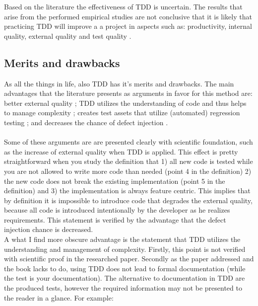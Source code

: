 Based on the literature the effectiveness of TDD is uncertain. The results that arise from the performed empirical
studies are not conclusive that it is likely that practicing TDD will improve a a project in aspects such as:
productivity, internal quality, external quality and test quality \autocite{SAC-J-2003-GeorgeW04} \autocite{MAKING_SOFTWARE}.

\subsection*{Merits and drawbacks}

As all the things in life, also TDD has it's merits and drawbacks. The main advantages that the literature presents
as arguments in favor for this method are:
better external quality \autocite[340]{SAC-J-2003-GeorgeW04} \autocite[212]{MAKING_SOFTWARE};
TDD utilizes the understanding of code and thus helps to manage complexity \autocite[338]{SAC-J-2003-GeorgeW04};
creates test assets that utilize (automated) regression testing \autocite[338]{SAC-J-2003-GeorgeW04} \autocite[208]{MAKING_SOFTWARE};
and decreases the chance of defect injection \autocite[338]{SAC-J-2003-GeorgeW04}.

\paragraph{}
Some of these arguments are are presented clearly with scientific foundation, such as the increase of external quality
when TDD is applied. This effect is pretty straightforward when you study the definition that 1) all new code is
tested while you are not allowed to write more code than needed (point 4 in the definition) 2) the new code does not
break the existing implementation (point 5 in the definition) and 3) the implementation is always feature centric.
This implies that by definition it is impossible to introduce code that degrades the external quality, because all
code is introduced intentionally by the developer as he realizes requirements. This statement is verified by the
advantage that the defect injection chance is decreased.\\
A what I find more obscure advantage is the statement that TDD utilizes the understanding and management of
complexity. Firstly, this point is not verified with scientific proof in the researched paper. Secondly as the paper \autocite[338]{SAC-J-2003-GeorgeW04} addressed and the book lacks to do, using TDD does not lead to formal documentation (while the test is your
documentation). The alternative to documentation in TDD are the produced tests, however the required information may
not be presented to the reader in a glance. For example: \\

